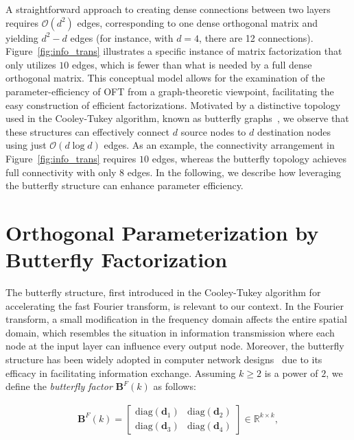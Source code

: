 A straightforward approach to creating dense connections between two layers requires $\mathcal{O}(d^2)$ edges, corresponding to one dense orthogonal matrix and yielding $d^2-d$ edges (for instance, with $d=4$, there are 12 connections). Figure~\ref{fig:info_trans} illustrates a specific instance of matrix factorization that only utilizes $10$ edges, which is fewer than what is needed by a full dense orthogonal matrix. This conceptual model allows for the examination of the parameter-efficiency of OFT from a graph-theoretic viewpoint, facilitating the easy construction of efficient factorizations. Motivated by a distinctive topology used in the Cooley-Tukey algorithm, known as butterfly graphs~\cite{cooley1965algorithm}, we observe that these structures can effectively connect $d$ source nodes to $d$ destination nodes using just $\mathcal{O}(d\log d)$ edges. As an example, the connectivity arrangement in Figure~\ref{fig:info_trans} requires $10$ edges, whereas the butterfly topology achieves full connectivity with only $8$ edges. In the following, we describe how leveraging the butterfly structure can enhance parameter efficiency.

\section{Orthogonal Parameterization by Butterfly Factorization}

The butterfly structure, first introduced in the Cooley-Tukey algorithm for accelerating the fast Fourier transform, is relevant to our context. In the Fourier transform, a small modification in the frequency domain affects the entire spatial domain, which resembles the situation in information transmission where each node at the input layer can influence every output node. Moreover, the butterfly structure has been widely adopted in computer network designs~\cite{solihin2015fundamentals,li2011linear} due to its efficacy in facilitating information exchange. Assuming $k\geq 2$ is a power of $2$, we define the \emph{butterfly factor} $\bm{B}^F(k)$ as follows:

\begin{equation}\label{eq:but_factor}
\begin{aligned}
    \bm{B}^F(k)=\begin{bmatrix}
    \text{diag}(\bm{d}_1) & \text{diag}(\bm{d}_2) \\
    \text{diag}(\bm{d}_3) & \text{diag}(\bm{d}_4)
    \end{bmatrix}\in\mathbb{R}^{k\times k},
\end{aligned}
\end{equation}

